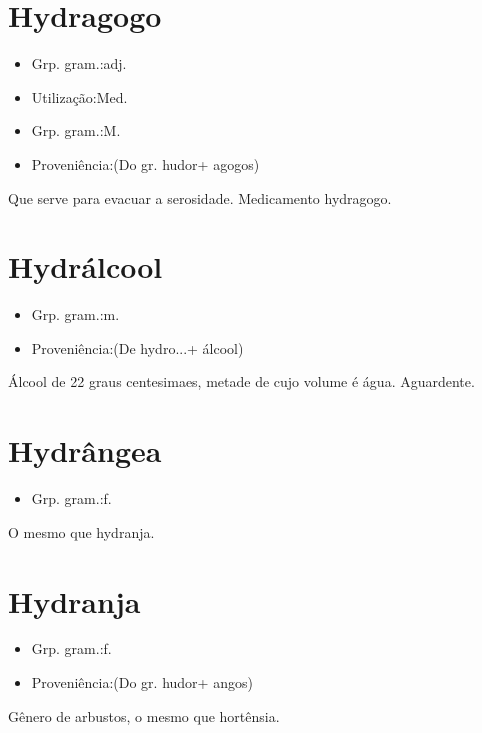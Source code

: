 \documentclass{article}
\begin{document}
\section{Hydragogo}
\begin{itemize}
\item {Grp. gram.:adj.}
\end{itemize}
\begin{itemize}
\item {Utilização:Med.}
\end{itemize}
\begin{itemize}
\item {Grp. gram.:M.}
\end{itemize}
\begin{itemize}
\item {Proveniência:(Do gr. \textunderscore hudor\textunderscore  + \textunderscore agogos\textunderscore )}
\end{itemize}
Que serve para evacuar a serosidade.
Medicamento hydragogo.
\section{Hydrálcool}
\begin{itemize}
\item {Grp. gram.:m.}
\end{itemize}
\begin{itemize}
\item {Proveniência:(De \textunderscore hydro...\textunderscore  + \textunderscore álcool\textunderscore )}
\end{itemize}
Álcool de 22 graus centesimaes, metade de cujo volume é água.
Aguardente.
\section{Hydrângea}
\begin{itemize}
\item {Grp. gram.:f.}
\end{itemize}
O mesmo que \textunderscore hydranja\textunderscore .
\section{Hydranja}
\begin{itemize}
\item {Grp. gram.:f.}
\end{itemize}
\begin{itemize}
\item {Proveniência:(Do gr. \textunderscore hudor\textunderscore  + \textunderscore angos\textunderscore )}
\end{itemize}
Gênero de arbustos, o mesmo que \textunderscore hortênsia\textunderscore .
\end{document}
